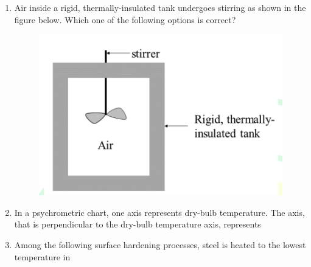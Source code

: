 \documentclass[journal]{IEEEtran}
\begin{document}
\begin{enumerate}[leftmargin=0pt]
\item
Air inside a rigid, thermally-insulated tank undergoes stirring as shown in the figure below. Which one of the following options is correct?
\begin{figure}[H]\includegraphics[width=0.5\columnwidth]{Figs/image (97).png}\caption*{}\label{fig:q18}\end{figure}
\vspace{0.2cm}
\begin{enumerate}
\end{enumerate}
\hfill{}

\item
In a psychrometric chart, one axis represents dry-bulb temperature. The axis, that is perpendicular to the dry-bulb temperature axis, represents

\vspace{0.2cm}
\begin{enumerate}
\end{enumerate}
\hfill{}

\item
Among the following surface hardening processes, steel is heated to the lowest temperature in


\end{enumerate}
\end{document}

